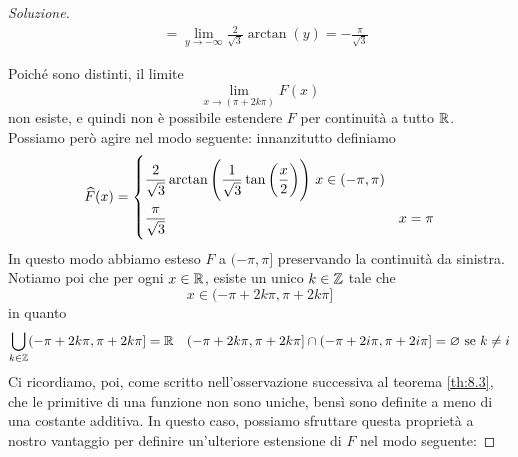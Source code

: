 \begin{proof}[Soluzione]
\[\begin{split}
        & = \lim_{y\to -\infty} \frac{2}{\sqrt{3}}\arctan(y) = -\frac{\pi}{\sqrt{3}}
    \end{split}
    \]
    \begin{center}
    \end{center}
    Poiché sono distinti, il limite
    \[
    \lim_{x\to (\pi +2k\pi)} F(x)
    \]
    non esiste, e quindi non è possibile estendere $F$ per continuità a tutto $\amsbb{R}$. Possiamo però agire nel modo seguente: innanzitutto definiamo
    \[
    \widehat{F}(x) = \begin{dcases}
        \frac{2}{\sqrt{3}}\arctan\left(\frac{1}{\sqrt{3}}\tan\left(\frac{x}{2}\right)\right)\, x\in(-\pi, \pi) \\
        \frac{\pi}{\sqrt{3}}\, & x=\pi
    \end{dcases}
    \]
    In questo modo abbiamo esteso $F$ a $(-\pi, \pi]$ preservando la continuità da sinistra. Notiamo poi che per ogni $x\in\amsbb{R}$, esiste un unico $k\in\amsbb{Z}$ tale che
    \[
    x\in(-\pi + 2k\pi, \pi + 2k\pi]
    \]
    in quanto
    \[
    \bigcup_{k\in\amsbb{Z}} (-\pi + 2k\pi, \pi +2k\pi] = \amsbb{R} \quad (-\pi+2k\pi, \pi+2k\pi]\cap (-\pi+2i\pi, \pi+2i\pi]=\varnothing \ \text{se} \ k\ne i
    \]
    Ci ricordiamo, poi, come scritto nell'osservazione successiva al teorema \ref{th:8.3}, che le primitive di una funzione non sono uniche, bensì sono definite a meno di una costante additiva. In questo caso, possiamo sfruttare questa proprietà a nostro vantaggio per definire un'ulteriore estensione di $F$ nel modo seguente:

\end{proof}
